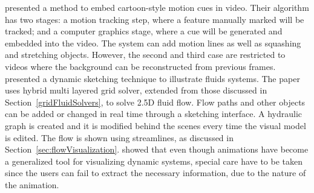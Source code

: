 \cite{Collomosse2005} presented a method to embed cartoon-style motion cues in video.
Their algorithm has two stages: a motion tracking step, where a feature manually marked will be tracked; and a computer graphics stage, where a cue will be generated and embedded into the video.
The system can add motion lines as well as squashing and stretching objects.
However, the second and third case are restricted to videos where the background can be reconstructed from previous frames.
\cite{Zhu2011} presented a dynamic sketching technique to illustrate fluids systems.
The paper uses hybrid multi layered grid solver, extended from those discussed in Section~\ref{gridFluidSolvers}, to solve 2.5D fluid flow.
Flow paths and other objects can be added or changed in real time through a sketching interface.
A hydraulic graph is created and it is modified behind the scenes every time the visual model is edited.
The flow is shown using streamlines, as discussed in Section~\ref{sec:flowVisualization}.
\cite{Lowe2014} showed that even though animations have become a generalized tool for visualizing dynamic systems, special care have to be taken since the users can fail to extract the necessary information, due to the nature of the animation.